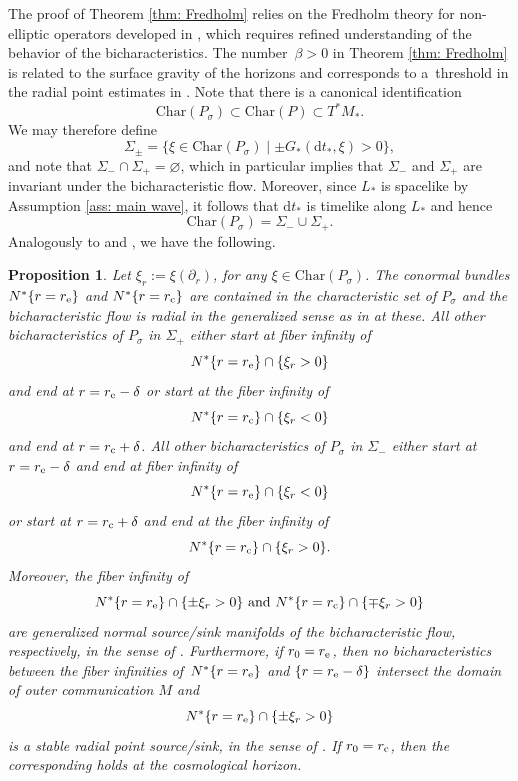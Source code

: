 \documentclass[pdftex]{sigma}
\renewcommand{\S}{\Sigma}
\newcommand{\de}{\delta}
\renewcommand{\b}{\beta}
\renewcommand{\d}{\partial}
\newcommand{\md}{\mathrm d}
\newcommand{\Char}{\mathrm{Char}}
\newcommand{\s}{\sigma}
\numberwithin{equation}{section}
\newtheorem{Proposition}[Theorem]{Proposition}
 { \theoremstyle{definition}
\newtheorem{Definition}[Theorem]{Definition}
\newtheorem{Note}[Theorem]{Note}
\newtheorem{Example}[Theorem]{Example}
\newtheorem{Remark}[Theorem]{Remark} }
\begin{document}
The proof of Theorem \ref{thm: Fredholm} relies on the Fredholm theory for non-elliptic operators developed in \cite{V2013}, which requires refined understanding of the behavior of the bicharacteristics.
The number~${\b > 0}$ in Theorem \ref{thm: Fredholm} is related to the surface gravity of the horizons and corresponds to a~threshold in the radial point estimates in \cite{V2013}.
Note that there is a canonical identification
\[
	\Char(P_\s)
		\subset \Char(P)
		\subset T^*M_*.
\]
We may therefore define
\[
	\S_\pm
		= \{ \xi \in \Char(P_\s) \mid \pm G_*(\md t_*, \xi) > 0 \},
\]
and note that $\S_- \cap \S_+ = \varnothing$, which in particular implies that $\S_-$ and $\S_+$ are invariant under the bicharacteristic flow.
Moreover, since $L_*$ is spacelike by Assumption \ref{ass: main wave}, it follows that $\md t_*$ is timelike along $L_*$ and hence
\[
	\Char(P_\s)
		= \S_- \cup \S_+.
\]
Analogously to \cite[Lemma~2.5]{PV2023} and \cite[Section~6]{V2013}, we have the following.
\begin{Proposition} \label{prop: classical radial points}
Let $\xi_r
		:= \xi(\d_r)$,
for any $\xi \in \Char(P_\s)$.
The conormal bundles $N^*\{r = r_{\rm e}\}$ and $N^*\{r = r_{\rm c}\}$ are contained in the characteristic set of $P_\s$ and the bicharacteristic flow is radial in the generalized sense as in {\rm\cite{V2013}} at these.
All other bicharacteristics of $P_\s$ in $\S_+$ either start at fiber infinity of
\[
	N^*\{r = r_{\rm e}\} \cap \{\xi_r > 0\}
\]
and end at $r = r_{\rm e} - \de$ or start at the fiber infinity of
\[
	N^*\{r = r_{\rm c}\} \cap \{\xi_r < 0\}
\]
and end at $r = r_{\rm c} + \de$.
All other bicharacteristics of $P_\s$ in $\S_-$ either start at $r = r_{\rm e} - \de$ and end at fiber infinity of
\[
	N^*\{r = r_{\rm e}\} \cap \{\xi_r < 0\}
\]
or start at $r = r_{\rm c} + \de$ and end at the fiber infinity of
\[
	N^*\{r = r_{\rm c}\} \cap \{\xi_r > 0\}.
\]
Moreover, the fiber infinity of
\[
	N^*\{r = r_{\rm e}\} \cap \{\pm \xi_r > 0\} \text{ and } N^*\{r = r_{\rm c}\} \cap \{\mp \xi_r > 0\}
\]
are generalized normal source/sink manifolds of the bicharacteristic flow, respectively, in the sense of {\rm\cite{V2013}}.
Furthermore, if $r_0 = r_{\rm e}$, then no bicharacteristics between the fiber infinities of~${N^*\{r = r_{\rm e}\}}$ and $\{r = r_{\rm e} - \de\}$ intersect the domain of outer communication $M$ and
\[N^*\{r = r_{\rm e}\} \cap \{\pm \xi_r > 0\}\]
 is a stable radial point source/sink, in the sense of {\rm\cite{V2013}}.
If $r_0 = r_{\rm c}$, then the corresponding holds at the cosmological horizon.
\end{Proposition}
\end{document}
